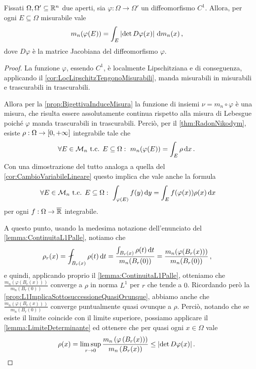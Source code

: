 \begin{lemma}\label{lemma:MisuraImmagine}
	Fissati $\Omega,\Omega'\subseteq\mathbb R^n$ due aperti, sia $\varphi:\Omega\to\Omega'$ un diffeomorfismo $C^1$.
	Allora, per ogni $E\subseteq \Omega$ misurabile vale
	\begin{equation*}
		m_n(\varphi(E))=\int_E\left\lvert \det D\varphi(x) \right\rvert \,\mathrm d m_n(x)\, \text{, }
	\end{equation*}
	dove $D\varphi$ è la matrice Jacobiana del diffeomorfismo $\varphi$.
\end{lemma}
\begin{proof}
	La funzione $\varphi$, essendo $C^1$, è localmente Lipschitziana e di conseguenza, applicando il \cref{cor:LocLipschitzTengonoMisurabili}, manda misurabili in misurabili e trascurabili in trascurabili.
	
	Allora per la \cref{prop:BigettivaInduceMisura} la funzione di insiemi $\nu=m_n\circ \varphi$ è una misura, che risulta essere assolutamente continua rispetto alla misura di Lebesgue poiché $\varphi$ manda trascurabili in trascurabili.
	Perciò, per il \cref{thm:RadonNikodym}, esiste $\rho:\Omega\to[0,+\infty]$ integrabile tale che
	\begin{equation*}
		\forall E\in \mathcal M_n\text{ t.c. } E\subseteq \Omega:\ m_n(\varphi(E))=\int_E \rho \,\mathrm d x \, \text{. }
	\end{equation*}
	Con una dimostrazione del tutto analoga a quella del \cref{cor:CambioVariabileLineare} questo implica che vale anche la formula
	\begin{equation}\label{eq:CambioRadonNikodym}
		\forall E\in \M_n\text{ t.c. } E\subseteq\Omega:\ \int_{\varphi(E)} f(y)\de y = \int_{E} f(\varphi(x))\rho(x) \de x
	\end{equation}
	per ogni $f:\Omega\to\overline{\mathbb R}$ integrabile.
	
	A questo punto, usando la medesima notazione dell'enunciato del \cref{lemma:ContinuitaL1Palle}, notiamo che
	\begin{equation*}
		\rho_r(x)=\aint_{B_r(x)}\rho(t)\de t=\frac{\int_{B_r(x)} \rho(t)\de t}{m_n(B_r(0))}=\frac{m_n(\varphi(B_r(x)))}{m_n(B_r(0))}\virgola
	\end{equation*}
	e quindi, applicando proprio il \cref{lemma:ContinuitaL1Palle}, otteniamo che $\frac{m_n(\varphi(B_r(x)))}{m_n(B_r(0))}$ converge a $\rho$ in norma $L^1$ per $r$ che tende a $0$.
	Ricordando però la \cref{prop:L1ImplicaSottosuccessioneQuasiOvunque}, abbiamo anche che $\frac{m_n(\varphi(B_r(x)))}{m_n(B_r(0))}$ converge puntualmente quasi ovunque a $\rho$. Perciò, notando che se esiste il limite coincide con il limite superiore, possiamo applicare il \cref{lemma:LimiteDeterminante} ed ottenere che per quasi ogni $x\in\Omega$ vale
	\begin{equation}\label{eq:DisuguaglianzaRadonNikodym}
		\rho(x)=\limsup_{r\to 0} \frac{ m_n\left(\varphi\left(B_r(x)\right)\right)} {m_n\left(B_r(x)\right)}\le \lvert\det D\varphi(x)\rvert \, \text{. }
	\end{equation}
	

\end{proof}
